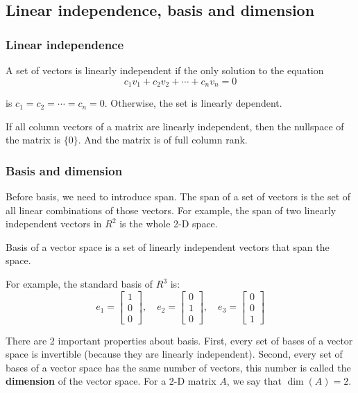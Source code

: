 \documentclass[12pt]{ctexart}
\begin{document}
\subsection{\textbf{Linear independence, basis and dimension}}
\subsubsection{\textbf{Linear independence}}

A set of vectors is linearly independent if the only solution to the equation
\[
  c_1 v_1 + c_2 v_2 + \cdots + c_n v_n = 0
\]

is $c_1 = c_2 = \cdots = c_n = 0$. Otherwise, the set is linearly dependent.

If all column vectors of a matrix are linearly independent, then the nullspace of
the matrix is $\{0\}$. And the matrix is of full column rank.

\subsubsection{\textbf{Basis and dimension}}

Before basis, we need to introduce span. The span of a set of vectors is the set of all
linear combinations of those vectors. For example, the span of two linearly independent
vectors in $R^{2}$ is the whole 2-D space.

Basis of a vector space is a set of linearly independent vectors that span the space.

For example, the standard basis of $R^{3}$ is:
\[
  e_1 = \begin{bmatrix} 1 \\ 0 \\ 0 \end{bmatrix}, \quad
  e_2 = \begin{bmatrix} 0 \\ 1 \\ 0 \end{bmatrix}, \quad
  e_3 = \begin{bmatrix} 0 \\ 0 \\ 1 \end{bmatrix}
\]

There are 2 important properties about basis. First, every set of bases of a vector
space is invertible (because they are linearly independent). Second, every set of bases of a vector
space has the same number of vectors, this number is called the \textbf{dimension} of
the vector space. For a 2-D matrix $A$, we say that $\dim(A) = 2$.
\end{document}
